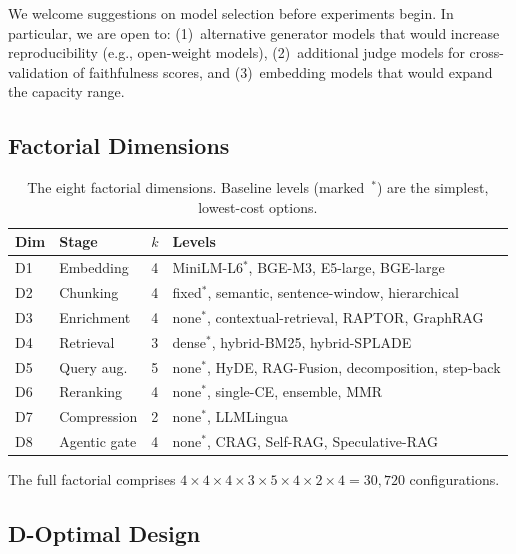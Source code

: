 \documentclass[11pt]{article}
\begin{document}
We welcome suggestions on model selection before experiments begin.
In particular, we are open to: (1)~alternative generator models that
would increase reproducibility (e.g., open-weight models),
(2)~additional judge models for cross-validation of faithfulness
scores, and (3)~embedding models that would expand the capacity range.

\subsection{Factorial Dimensions}

\begin{table}[h]
\centering
\footnotesize
\caption{The eight factorial dimensions.  Baseline levels (marked~$^*$)
  are the simplest, lowest-cost options.}
\label{tab:dimensions}
\begin{tabular}{@{}llcl@{}}
\toprule
Dim & Stage & $k$ & Levels \\
\midrule
D1 & Embedding      & 4 & MiniLM-L6$^*$, BGE-M3, E5-large, BGE-large \\
D2 & Chunking       & 4 & fixed$^*$, semantic, sentence-window, hierarchical \\
D3 & Enrichment     & 4 & none$^*$, contextual-retrieval, RAPTOR, GraphRAG \\
D4 & Retrieval      & 3 & dense$^*$, hybrid-BM25, hybrid-SPLADE \\
D5 & Query aug.     & 5 & none$^*$, HyDE, RAG-Fusion, decomposition, step-back \\
D6 & Reranking      & 4 & none$^*$, single-CE, ensemble, MMR \\
D7 & Compression    & 2 & none$^*$, LLMLingua \\
D8 & Agentic gate   & 4 & none$^*$, CRAG, Self-RAG, Speculative-RAG \\
\bottomrule
\end{tabular}
\end{table}

The full factorial comprises
$4 \times 4 \times 4 \times 3 \times 5 \times 4 \times 2 \times 4 =
30{,}720$ configurations.

\subsection{D-Optimal Design}
\end{document}
